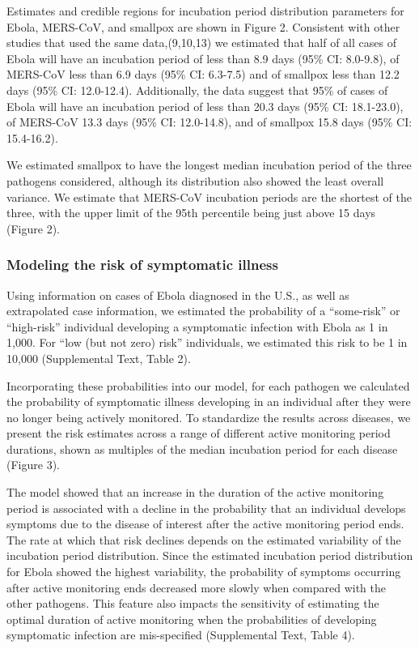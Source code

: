 \documentclass[]{article}
\begin{document}
Estimates and credible regions for incubation period distribution
parameters for Ebola, MERS-CoV, and smallpox are shown in Figure 2.
Consistent with other studies that used the same data,(9,10,13) we
estimated that half of all cases of Ebola will have an incubation period
of less than 8.9 days (95\% CI: 8.0-9.8), of MERS-CoV less than 6.9 days
(95\% CI: 6.3-7.5) and of smallpox less than 12.2 days (95\% CI:
12.0-12.4). Additionally, the data suggest that 95\% of cases of Ebola
will have an incubation period of less than 20.3 days (95\% CI:
18.1-23.0), of MERS-CoV 13.3 days (95\% CI: 12.0-14.8), and of smallpox
15.8 days (95\% CI: 15.4-16.2).

We estimated smallpox to have the longest median incubation period of
the three pathogens considered, although its distribution also showed
the least overall variance. We estimate that MERS-CoV incubation periods
are the shortest of the three, with the upper limit of the 95th
percentile being just above 15 days (Figure 2).

\subsubsection{Modeling the risk of symptomatic
illness}\label{modeling-the-risk-of-symptomatic-illness}

Using information on cases of Ebola diagnosed in the U.S., as well as
extrapolated case information, we estimated the probability of a
``some-risk'' or ``high-risk'' individual developing a symptomatic
infection with Ebola as 1 in 1,000. For ``low (but not zero) risk''
individuals, we estimated this risk to be 1 in 10,000 (Supplemental
Text, Table 2).

Incorporating these probabilities into our model, for each pathogen we
calculated the probability of symptomatic illness developing in an
individual after they were no longer being actively monitored. To
standardize the results across diseases, we present the risk estimates
across a range of different active monitoring period durations, shown as
multiples of the median incubation period for each disease (Figure 3).

The model showed that an increase in the duration of the active
monitoring period is associated with a decline in the probability that
an individual develops symptoms due to the disease of interest after the
active monitoring period ends. The rate at which that risk declines
depends on the estimated variability of the incubation period
distribution. Since the estimated incubation period distribution for
Ebola showed the highest variability, the probability of symptoms
occurring after active monitoring ends decreased more slowly when
compared with the other pathogens. This feature also impacts the
sensitivity of estimating the optimal duration of active monitoring when
the probabilities of developing symptomatic infection are mis-specified
(Supplemental Text, Table 4).
\end{document}
